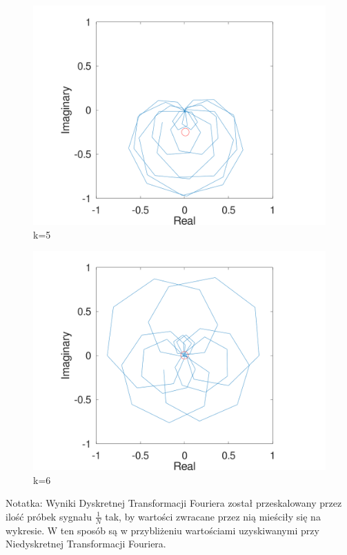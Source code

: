\documentclass{article}
\begin{document}
\begin{figure}
\includegraphics[width=1\linewidth]{fourier7.png}
\caption{k=5}
\end{figure}

\begin{figure}
\includegraphics[width=1\linewidth]{fourier8.png}
\caption{k=6}
\end{figure}

Notatka: Wyniki Dyskretnej Transformacji Fouriera został przeskalowany przez ilość próbek sygnału $\frac{1}{N}$ tak, by wartości zwracane przez nią mieściły się na wykresie. W ten sposób są w przybliżeniu wartościami uzyskiwanymi przy Niedyskretnej Transformacji Fouriera.
\end{document}

